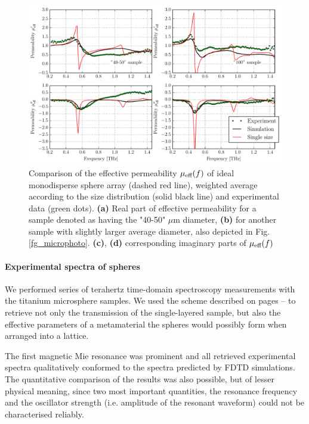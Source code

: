  \begin{figure}[ht]   %
	 \caption{Comparison of the effective permeability $\mu_{\text{eff} }(f)$ of ideal monodisperse sphere array (dashed red line), weighted average according to the size distribution (solid black line) and experimental data (green dots). \textbf{(a)} Real part of effective permeability for a sample denoted as having the "40-50" $\mu$m diameter, \textbf{(b)} for another sample with slightly larger average diameter, also depicted in Fig. \ref{fg_microphoto}. \textbf{(c)}, \textbf{(d)} corresponding imaginary parts of $\mu_{\text{eff} }(f)$}
\label{fg_mm2012_convolution} \centering 
\includegraphics[width=\textwidth]{img-expe/sphere_convolution/mm2012_convolution.pdf}
\end{figure}
\paragraph{Experimental spectra of spheres} %
We performed series of terahertz time-domain spectroscopy measurements with the titanium microsphere samples. We used the scheme described on pages \pageref{srtm}--\pageref{srtm2} to retrieve not only the transmission of the single-layered sample, but also the effective parameters of a metamaterial the spheres would possibly form when arranged into a lattice. 

The first magnetic Mie resonance was prominent and all retrieved experimental spectra qualitatively conformed to the spectra predicted by FDTD simulations. The quantitative comparison of the results was also possible, but of lesser physical meaning, since two most important quantities, the resonance frequency and the oscillator strength (i.e. amplitude of the resonant waveform) could not be characterised reliably. 

